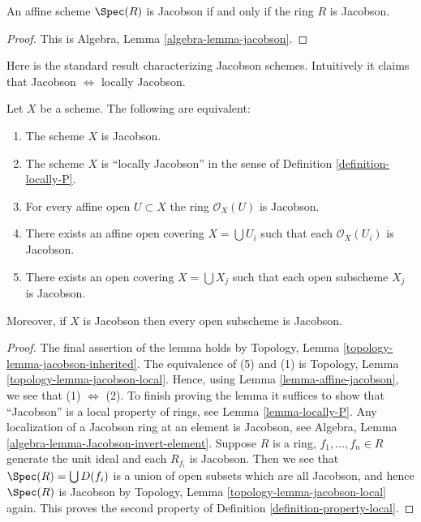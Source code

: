 \begin{lemma}
\label{lemma-affine-jacobson}
An affine scheme $\Spec(R)$ is Jacobson if and only if
the ring $R$ is Jacobson.
\end{lemma}

\begin{proof}
This is Algebra, Lemma \ref{algebra-lemma-jacobson}.
\end{proof}

\noindent
Here is the standard result characterizing Jacobson schemes.
Intuitively it claims that Jacobson $\Leftrightarrow$ locally Jacobson.

\begin{lemma}
\label{lemma-locally-jacobson}
Let $X$ be a scheme. The following are equivalent:
\begin{enumerate}
\item The scheme $X$ is Jacobson.
\item The scheme $X$ is ``locally Jacobson'' in the sense of
Definition \ref{definition-locally-P}.
\item For every affine open $U \subset X$ the ring $\mathcal{O}_X(U)$
is Jacobson.
\item There exists an affine open covering $X = \bigcup U_i$ such that
each $\mathcal{O}_X(U_i)$ is Jacobson.
\item There exists an open covering $X = \bigcup X_j$
such that each open subscheme $X_j$ is Jacobson.
\end{enumerate}
Moreover, if $X$ is Jacobson then every open subscheme
is Jacobson.
\end{lemma}

\begin{proof}
The final assertion of the lemma holds by
Topology, Lemma \ref{topology-lemma-jacobson-inherited}.
The equivalence of (5) and (1) is
Topology, Lemma \ref{topology-lemma-jacobson-local}.
Hence, using Lemma \ref{lemma-affine-jacobson},
we see that (1) $\Leftrightarrow$ (2).
To finish proving the lemma it suffices to show that ``Jacobson''
is a local property of rings, see Lemma \ref{lemma-locally-P}.
Any localization of a Jacobson ring at an element is Jacobson, see
Algebra, Lemma \ref{algebra-lemma-Jacobson-invert-element}.
Suppose $R$ is a ring, $f_1, \ldots, f_n \in R$ generate the unit
ideal and each $R_{f_i}$ is Jacobson. Then we see that
$\Spec(R) = \bigcup D(f_i)$ is a union of open subsets
which are all Jacobson, and hence $\Spec(R)$ is Jacobson
by Topology, Lemma \ref{topology-lemma-jacobson-local} again.
This proves the second property of Definition \ref{definition-property-local}.
\end{proof}


